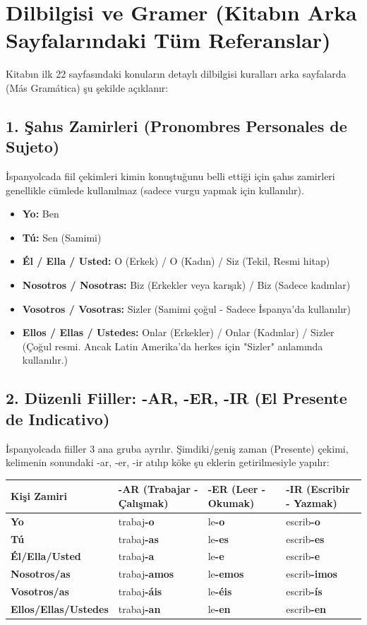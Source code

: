 \documentclass[12pt,a4paper]{article}
\begin{document}
\newpage
\section{Dilbilgisi ve Gramer (Kitabın Arka Sayfalarındaki Tüm Referanslar)}
Kitabın ilk 22 sayfasındaki konuların detaylı dilbilgisi kuralları arka sayfalarda (Más Gramática) şu şekilde açıklanır:

\subsection{1. Şahıs Zamirleri (Pronombres Personales de Sujeto)}
İspanyolcada fiil çekimleri kimin konuştuğunu belli ettiği için şahıs zamirleri genellikle cümlede kullanılmaz (sadece vurgu yapmak için kullanılır).
\begin{itemize}
    \item \textbf{Yo:} Ben
    \item \textbf{Tú:} Sen (Samimi)
    \item \textbf{Él / Ella / Usted:} O (Erkek) / O (Kadın) / Siz (Tekil, Resmi hitap)
    \item \textbf{Nosotros / Nosotras:} Biz (Erkekler veya karışık) / Biz (Sadece kadınlar)
    \item \textbf{Vosotros / Vosotras:} Sizler (Samimi çoğul - Sadece İspanya'da kullanılır)
    \item \textbf{Ellos / Ellas / Ustedes:} Onlar (Erkekler) / Onlar (Kadınlar) / Sizler (Çoğul resmi. Ancak Latin Amerika'da herkes için "Sizler" anlamında kullanılır.)
\end{itemize}

\subsection{2. Düzenli Fiiller: -AR, -ER, -IR (El Presente de Indicativo)}
İspanyolcada fiiller 3 ana gruba ayrılır. Şimdiki/geniş zaman (Presente) çekimi, kelimenin sonundaki -ar, -er, -ir atılıp köke şu eklerin getirilmesiyle yapılır:

\begin{table}[h]
\centering
\begin{tabularx}{\textwidth}{l X X X}
\toprule
\textbf{Kişi Zamiri} & \textbf{-AR (Trabajar - Çalışmak)} & \textbf{-ER (Leer - Okumak)} & \textbf{-IR (Escribir - Yazmak)} \\
\midrule
\textbf{Yo} & trabaj\textbf{-o} & le\textbf{-o} & escrib\textbf{-o} \\
\textbf{Tú} & trabaj\textbf{-as} & le\textbf{-es} & escrib\textbf{-es} \\
\textbf{Él/Ella/Usted} & trabaj\textbf{-a} & le\textbf{-e} & escrib\textbf{-e} \\
\textbf{Nosotros/as} & trabaj\textbf{-amos} & le\textbf{-emos} & escrib\textbf{-imos} \\
\textbf{Vosotros/as} & trabaj\textbf{-áis} & le\textbf{-éis} & escrib\textbf{-ís} \\
\textbf{Ellos/Ellas/Ustedes} & trabaj\textbf{-an} & le\textbf{-en} & escrib\textbf{-en} \\
\bottomrule
\end{tabularx}
\end{table}
\end{document}
